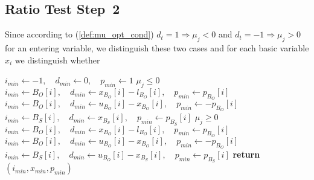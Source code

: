 \documentclass[a4paper]{article}
\begin{document}
\subsection{Ratio Test Step~2}
Since according to (\ref{def:mu_opt_cond}) $d_{t}=1 \Rightarrow \mu_{j}<0$ and $d_{t}=-1 \Rightarrow \mu_{j}>0$ for an entering variable, we distinguish these two cases and for each basic variable $x_{i}$ we distinguish whether  
\begin{algorithmic}
\State $i_{min} \gets -1, \quad d_{min} \gets 0, \quad  p_{min} \gets 1$
\Comment $\mu_{j} \leq 0$
                \State $i_{min} \gets B_{O}[i],
                            \quad d_{min} \gets x_{B_{O}}[i]-l_{B_{O}}[i],
                            \quad p_{min} \gets p_{B_{O}}[i]$
            \EndIf
        \EndIf 
                \State $i_{min} \gets B_{O}[i],
                            \quad d_{min} \gets u_{B_{O}}[i]-x_{B_{O}}[i],
                            \quad p_{min} \gets -p_{B_{O}}[i]$
            \EndIf
        \EndIf 
    \EndFor
                \State $i_{min} \gets B_{S}[i],
                            \quad d_{min} \gets x_{B_{S}}[i],
                            \quad p_{min} \gets p_{B_{S}}[i]$
            \EndIf	
        \EndIf 
    \EndFor
\Else
\Comment $\mu_{j} \geq 0$
                \State $i_{min} \gets B_{O}[i],
                            \quad d_{min} \gets x_{B_{O}}[i]-l_{B_{O}}[i],
                            \quad p_{min} \gets p_{B_{O}}[i]$
            \EndIf
        \EndIf
                \State $i_{min} \gets B_{O}[i],
                            \quad d_{min} \gets u_{B_{O}}[i]-x_{B_{O}}[i],
                            \quad p_{min} \gets -p_{B_{O}}[i]$
            \EndIf
        \EndIf 
    \EndFor
                \State $i_{min} \gets B_{S}[i],
                            \quad d_{min} \gets u_{B_{O}}[i]-x_{B_{S}}[i],
                            \quad p_{min} \gets p_{B_{S}}[i]$
            \EndIf	
        \EndIf 
    \EndFor
\EndIf
\State \textbf{return} $(i_{min}, x_{min}, p_{min})$
\EndFunction
\end{algorithmic}
\end{document}
